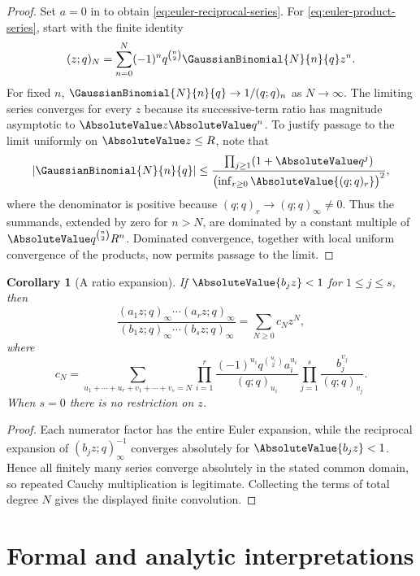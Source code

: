 \documentclass[11pt,a4paper,oneside,openany]{book}
\newtheorem{corollary}[corollary]{Corollary}
\theoremstyle{definition}
\theoremstyle{remark}
\begin{document}
\begin{proof}
Set $a=0$ in  to obtain \eqref{eq:euler-reciprocal-series}.  For \eqref{eq:euler-product-series}, start with the finite identity
\[
 (z;q)_N=\sum_{n=0}^{N}(-1)^nq^{\binom n2}\GaussianBinomial{N}{n}{q} z^n.
\]
For fixed $n$, $\GaussianBinomial{N}{n}{q}\to1/(q;q)_n$ as $N\to\infty$.  The limiting series converges for every $z$ because its successive-term ratio has magnitude asymptotic to $\AbsoluteValue z\AbsoluteValue q^n$.  To justify passage to the limit uniformly on $\AbsoluteValue z\le R$, note that
\[
 \left|\GaussianBinomial{N}{n}{q}\right|
 \le
 \frac{\prod_{j\ge1}(1+\AbsoluteValue q^j)}
      {\bigl(\inf_{r\ge0}\AbsoluteValue{(q;q)_r}\bigr)^{2}},
\]
where the denominator is positive because $(q;q)_r\to(q;q)_\infty\ne0$.  Thus the summands, extended by zero for $n>N$, are dominated by a constant multiple of $\AbsoluteValue q^{\binom n2}R^n$.  Dominated convergence, together with local uniform convergence of the products, now permits passage to the limit.
\end{proof}

\begin{corollary}[A ratio expansion]\label{cor:ratio-expansion}
If $\AbsoluteValue{b_jz}<1$ for $1\le j\le s$, then
\[
 \frac{(a_1z;q)_\infty\cdots(a_rz;q)_\infty}
 {(b_1z;q)_\infty\cdots(b_sz;q)_\infty}
 =\sum_{N\ge0}c_Nz^N,
\]
where
\[
 c_N=\!\sum_{u_1+\cdots+u_r+v_1+\cdots+v_s=N}
 \prod_{i=1}^r
 \frac{(-1)^{u_i}q^{\binom{u_i}{2}}a_i^{u_i}}{(q;q)_{u_i}}
 \prod_{j=1}^s\frac{b_j^{v_j}}{(q;q)_{v_j}}.
\]
When $s=0$ there is no restriction on $z$.
\end{corollary}

\begin{proof}
Each numerator factor has the entire Euler expansion, while the reciprocal
expansion of $(b_jz;q)_\infty^{-1}$ converges absolutely for
$\AbsoluteValue{b_jz}<1$.  Hence all finitely many series converge absolutely
in the stated common domain, so repeated Cauchy multiplication is legitimate.
Collecting the terms of total degree $N$ gives the displayed finite
convolution.
\end{proof}

\section{Formal and analytic interpretations}
\end{document}
